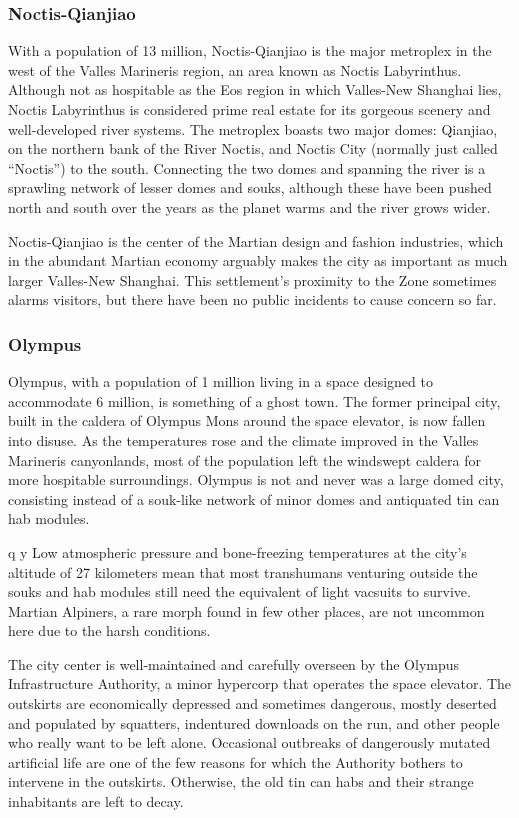\subsubsection{Noctis-Qianjiao}

With a population of 13 million, Noctis-Qianjiao is 
the major metroplex in the west of the Valles Marineris
region, an area known as Noctis Labyrinthus.
Although not as hospitable as the Eos region in which 
Valles-New Shanghai lies, Noctis Labyrinthus is considered
prime real estate for its gorgeous scenery and
well-developed river systems. The metroplex boasts 
two major domes: Qianjiao, on the northern bank 
of the River Noctis, and Noctis City (normally just 
called ``Noctis'') to the south. Connecting the two 
domes and spanning the river is a sprawling network 
of lesser domes and souks, although these have been 
pushed north and south over the years as the planet 
warms and the river grows wider.

Noctis-Qianjiao is the center of the Martian design 
and fashion industries, which in the abundant Martian
economy arguably makes the city as important
as much larger Valles-New Shanghai. This settlement's 
proximity to the Zone sometimes alarms visitors, but 
there have been no public incidents to cause concern 
so far.

\subsubsection{Olympus}


Olympus, with a population of 1 million living 
in a space designed to accommodate 6 million, is 
something of a ghost town. The former principal 
city, built in the caldera of Olympus Mons around 
the space elevator, is now fallen into disuse. As the 
temperatures rose and the climate improved in the 
Valles Marineris canyonlands, most of the population
left the windswept caldera for more hospitable
surroundings. Olympus is not and never was a large 
domed city, consisting instead of a souk-like network 
of minor domes and antiquated tin can hab modules. 

q
y
Low atmospheric pressure and bone-freezing temperatures
at the city's altitude of 27 kilometers mean
that most transhumans venturing outside the souks 
and hab modules still need the equivalent of light 
vacsuits to survive. Martian Alpiners, a rare morph 
found in few other places, are not uncommon here 
due to the harsh conditions.

The city center is well-maintained and carefully 
overseen by the Olympus Infrastructure Authority, 
a minor hypercorp that operates the space elevator. 
The outskirts are economically depressed and sometimes
dangerous, mostly deserted and populated by
squatters, indentured downloads on the run, and 
other people who really want to be left alone. Occasional
outbreaks of dangerously mutated artificial
life are one of the few reasons for which the Authority
bothers to intervene in the outskirts. Otherwise,
the old tin can habs and their strange inhabitants are 
left to decay.

